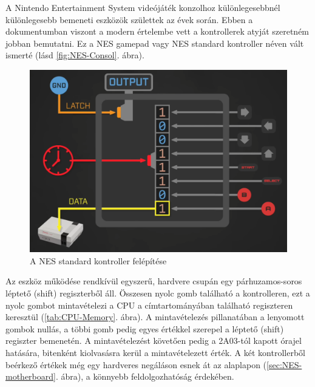 	A Nintendo Entertainment System videójáték konzolhoz különlegesebbnél különlegesebb bemeneti eszközök születtek az évek során. Ebben a dokumentumban viszont a modern értelembe vett a kontrollerek atyját szeretném jobban bemutatni. Ez a NES gamepad vagy NES standard kontroller néven vált ismerté (lásd \ref{fig:NES-Consol}. ábra).
	
	\begin{figure}[H]
	\centering
	\includegraphics[width=120mm, keepaspectratio]{figures/NES-controller-working}
	\caption{A NES standard kontroller felépítése \cite{Neshacker_controller}}
	\label{fig:NES-controller-working}
	\end{figure} 
	
	Az eszköz működése rendkívül egyszerű, hardvere csupán egy párhuzamos-soros léptető (shift) regiszterből áll. Összesen nyolc gomb található a kontrolleren, ezt a nyolc gombot mintavételezi a CPU a címtartományában található regiszteren keresztül (\ref{tab:CPU-Memory}. ábra). A mintavételezés pillanatában a lenyomott gombok nullás, a többi gomb pedig egyes értékkel szerepel a léptető (shift) regiszter bemenetén. A mintavételezést követően pedig a 2A03-tól kapott órajel hatására, bitenként kiolvasásra kerül a mintavételezett érték. A két kontrollerből beérkező értékek még egy hardveres negáláson esnek át az alaplapon (\ref{sec:NES-motherboard}. ábra), a könnyebb feldolgozhatóság érdekében. 